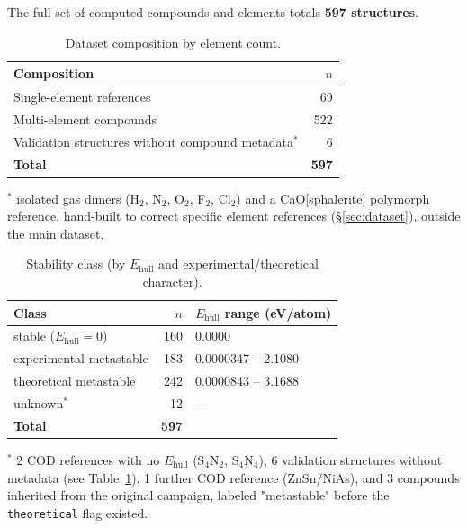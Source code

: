 \documentclass[11pt,a4paper]{article}
\begin{document}
The full set of computed compounds and elements totals \textbf{597
structures}.

\begin{table}[htbp]
\centering
\caption{Dataset composition by element count.}
\label{tab:composition}
\begin{tabular}{@{}lr@{}}
\toprule
Composition & $n$ \\
\midrule
Single-element references & 69 \\
Multi-element compounds   & 522 \\
Validation structures without compound metadata$^*$ & 6 \\
\midrule
\textbf{Total}             & \textbf{597} \\
\bottomrule
\end{tabular}

\vspace{0.15cm}
{\footnotesize $^*$ isolated gas dimers (H$_2$, N$_2$, O$_2$, F$_2$,
Cl$_2$) and a CaO[sphalerite] polymorph reference, hand-built to correct
specific element references (\S\ref{sec:dataset}), outside the
main dataset.}
\end{table}

\begin{table}[htbp]
\centering
\caption{Stability class (by $E_\text{hull}$ and experimental/theoretical character).}
\label{tab:stability}
\begin{tabular}{@{}lrl@{}}
\toprule
Class & $n$ & $E_\text{hull}$ range (eV/atom) \\
\midrule
stable ($E_\text{hull}=0$)  & 160 & 0.0000 \\
experimental metastable     & 183 & 0.0000347 -- 2.1080 \\
theoretical metastable      & 242 & 0.0000843 -- 3.1688 \\
unknown$^*$ & 12 & --- \\
\midrule
\textbf{Total}               & \textbf{597} & \\
\bottomrule
\end{tabular}

\vspace{0.15cm}
{\footnotesize $^*$ 2 COD references with no $E_\text{hull}$ (S$_4$N$_2$,
S$_4$N$_4$), 6 validation structures without metadata (see
Table~\ref{tab:composition}), 1 further COD reference (ZnSn/NiAs), and 3
compounds inherited from the original campaign, labeled "metastable"
before the \texttt{theoretical} flag existed.}
\end{table}
\end{document}
